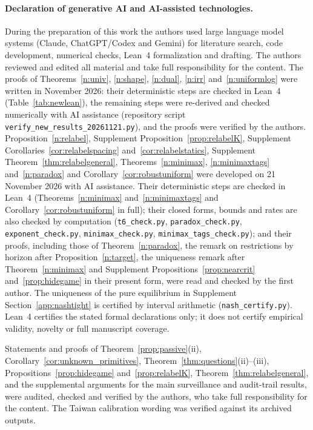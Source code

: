 \documentclass[12pt]{article}
\theoremstyle{definition}
\theoremstyle{remark}
\begin{document}
\paragraph{Declaration of generative AI and AI-assisted technologies.} During the preparation of this work the authors used large language model systems (Claude, ChatGPT/Codex and Gemini) for literature search, code development, numerical checks, Lean~4 formalization and drafting. The authors reviewed and edited all material and take full responsibility for the content. The proofs of Theorems~\ref{n:univ}, \ref{n:shape}, \ref{n:dual}, \ref{n:irr} and~\ref{n:uniformlog} were written in November 2026: their deterministic steps are checked in Lean~4 (Table~\ref{tab:newlean}), the remaining steps were re-derived and checked numerically with AI assistance (repository script \texttt{verify\_new\_results\_20261121.py}), and the proofs were verified by the authors. Proposition~\ref{n:relabel}, Supplement Proposition~\ref{prop:relabelK}, Supplement Corollaries~\ref{cor:relabelspacing} and~\ref{cor:relabelstatics}, Supplement Theorem~\ref{thm:relabelgeneral}, Theorems~\ref{n:minimax}, \ref{n:minimaxtags} and~\ref{n:paradox} and Corollary~\ref{cor:robustuniform} were developed on 21 November 2026 with AI assistance. Their deterministic steps are checked in Lean~4 (Theorems~\ref{n:minimax} and~\ref{n:minimaxtags} and Corollary~\ref{cor:robustuniform} in full); their closed forms, bounds and rates are also checked by computation (\texttt{t6\_check.py}, \texttt{paradox\_check.py}, \texttt{exponent\_check.py}, \texttt{minimax\_check.py}, \texttt{minimax\_tags\_check.py}); and their proofs, including those of Theorem~\ref{n:paradox}, the remark on restrictions by horizon after Proposition~\ref{n:target}, the uniqueness remark after Theorem~\ref{n:minimax} and Supplement Propositions~\ref{prop:nearcrit} and~\ref{prop:hidegame} in their present form, were read and checked by the first author. The uniqueness of the pure equilibrium in Supplement Section~\ref{app:nashtight} is certified by interval arithmetic (\texttt{nash\_certify.py}). Lean~4 certifies the stated formal declarations only; it does not certify empirical validity, novelty or full manuscript coverage.

 Statements and proofs of Theorem~\ref{prop:passive}(ii), Corollary~\ref{cor:unknown_primitives}, Theorem~\ref{thm:questions}(ii)--(iii), Propositions~\ref{prop:hidegame} and~\ref{prop:relabelK}, Theorem~\ref{thm:relabelgeneral}, and the supplemental arguments for the main surveillance and audit-trail results, were audited, checked and verified by the authors, who take full responsibility for the content. The Taiwan calibration wording was verified against its archived outputs.
\end{document}
